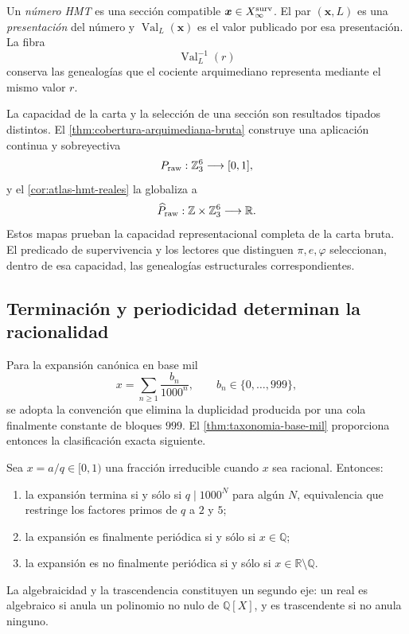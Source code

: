 \begin{definition}
\label{p3-83-c44-s1:def:numero-presentacion-valor-rev11}
Un \emph{n\'umero HMT} es una secci\'on compatible
\(\boldsymbol x\in X_{\infty}^{\rm surv}\). El par
\((\boldsymbol x,L)\) es una \emph{presentaci\'on} del n\'umero y
\(\operatorname{Val}_{L}(\boldsymbol x)\) es el valor publicado por esa
presentaci\'on. La fibra
\[
 \operatorname{Val}_{L}^{-1}(r)
\]
conserva las genealog\'ias que el cociente arquimediano representa mediante
el mismo valor \(r\).
\end{definition}

La capacidad de la carta y la selecci\'on de una secci\'on son resultados
tipados distintos. El \cref{thm:cobertura-arquimediana-bruta} construye una
aplicaci\'on continua y sobreyectiva
\[
 P_{\rm raw}:\mathbb Z_3^6\longrightarrow[0,1],
\]
y el \cref{cor:atlas-hmt-reales} la globaliza a
\[
 \widehat P_{\rm raw}:\mathbb Z\times\mathbb Z_3^6
 \longrightarrow\mathbb R.
\]
Estos mapas prueban la capacidad representacional completa de la carta bruta.
El predicado de supervivencia y los lectores que distinguen
\(\pi,e,\varphi\) seleccionan, dentro de esa capacidad, las genealog\'ias
estructurales correspondientes.

\subsection{Terminaci\'on y periodicidad determinan la racionalidad}

Para la expansi\'on can\'onica en base mil
\[
 x=\sum_{n\geq1}\frac{b_n}{1000^n},
 \qquad b_n\in\{0,\ldots,999\},
\]
se adopta la convenci\'on que elimina la duplicidad producida por una cola
finalmente constante de bloques \(999\). El
\cref{thm:taxonomia-base-mil} proporciona entonces la clasificaci\'on exacta
siguiente.

\begin{theorem}
\label{p3-83-c44-s1:thm:clasificacion-visible-rev11}
Sea \(x=a/q\in[0,1)\) una fracci\'on irreducible cuando \(x\) sea racional.
Entonces:
\begin{enumerate}
\item la expansi\'on termina si y s\'olo si \(q\mid1000^N\) para alg\'un
      \(N\), equivalencia que restringe los factores primos de \(q\) a
      \(2\) y \(5\);
\item la expansi\'on es finalmente peri\'odica si y s\'olo si
      \(x\in\mathbb Q\);
\item la expansi\'on es no finalmente peri\'odica si y s\'olo si
      \(x\in\mathbb R\setminus\mathbb Q\).
\end{enumerate}
La algebraicidad y la trascendencia constituyen un segundo eje: un real es
algebraico si anula un polinomio no nulo de \(\mathbb Q[X]\), y es
trascendente si no anula ninguno.
\end{theorem}

